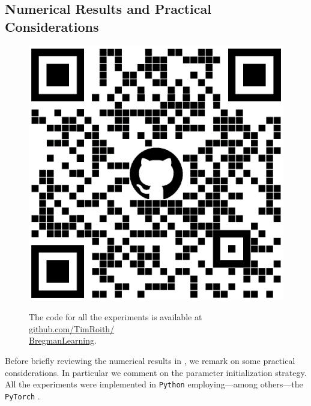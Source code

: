 \subsection{Numerical Results and Practical Considerations}\label{sec:Bregnum}
%
%
\begin{figure}
	\begin{center}
		\includegraphics[width=.4\textwidth]{atelier/Breg_dist/BregQR.png}
	\end{center}
	The code for all the experiments is available at \href{https://github.com/TimRoith/BregmanLearning}{github.com/TimRoith/}\\
	\href{https://github.com/TimRoith/BregmanLearning}{BregmanLearning}.
\end{figure}
Before briefly reviewing the numerical results in \cite[Sec. 4]{bungert2022bregman}, we remark on some practical considerations. In particular we comment on the parameter initialization strategy. All the experiments were implemented in \texttt{Python} \cite{van1995python} employing---among others---the \texttt{PyTorch} \cite{paszke2019pytorch}.
%
